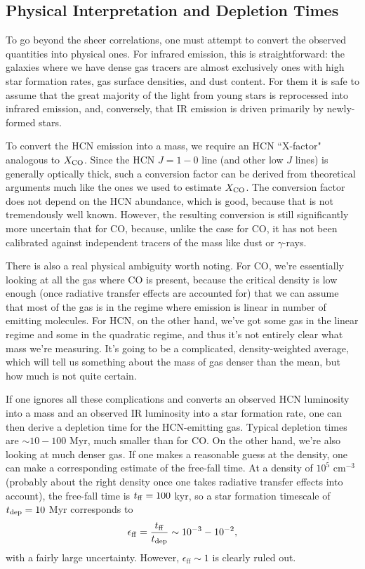 \subsection{Physical Interpretation and Depletion Times}

To go beyond the sheer correlations, one must attempt to convert the observed quantities into physical ones. For infrared emission, this is straightforward: the galaxies where we have dense gas tracers are almost exclusively ones with high star formation rates, gas surface densities, and dust content. For them it is safe to assume that the great majority of the light from young stars is reprocessed into infrared emission, and, conversely, that IR emission is driven primarily by newly-formed stars.

To convert the HCN emission into a mass, we require an HCN ``X-factor" analogous to $X_{\rm CO}$. Since the HCN $J=1-0$ line (and other low $J$ lines) is generally optically thick, such a conversion factor can be derived from theoretical arguments much like the ones we used to estimate $X_{\rm CO}$. The conversion factor does not depend on the HCN abundance, which is good, because that is not tremendously well known. However, the resulting conversion is still significantly more uncertain that for CO, because, unlike the case for CO, it has not been calibrated against independent tracers of the mass like dust or $\gamma$-rays.

There is also a real physical ambiguity worth noting. For CO, we're essentially looking at all the gas where CO is present, because the critical density is low enough (once radiative transfer effects are accounted for) that we can assume that most of the gas is in the regime where emission is linear in number of emitting molecules. For HCN, on the other hand, we've got some gas in the linear regime and some in the quadratic regime, and thus it's not entirely clear what mass we're measuring. It's going to be a complicated, density-weighted average, which will tell us something about the mass of gas denser than the mean, but how much is not quite certain.

If one ignores all these complications and converts an observed HCN luminosity into a mass and an observed IR luminosity into a star formation rate, one can then derive a depletion time for the HCN-emitting gas. Typical depletion times are $\sim 10-100$ Myr, much smaller than for CO. On the other hand, we're also looking at much denser gas. If one makes a reasonable guess at the density, one can make a corresponding estimate of the free-fall time. At a density of $10^5$ cm$^{-3}$ (probably about the right density once one takes radiative transfer effects into account), the free-fall time is $t_{\rm ff} = 100$ kyr, so a star formation timescale of $t_{\rm dep} = 10$ Myr corresponds to
\begin{equation}
\epsilon_{\rm ff} = \frac{t_{\rm ff}}{t_{\rm dep}} \sim 10^{-3} - 10^{-2},
\end{equation}
with a fairly large uncertainty. However, $\epsilon_{\mathrm{ff}} \sim 1$ is clearly ruled out.
